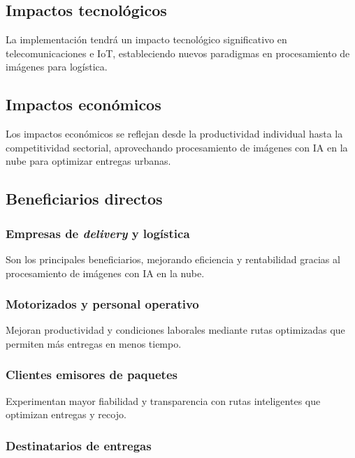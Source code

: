 \subsection{Impactos tecnológicos}

La implementación tendrá un impacto tecnológico significativo en telecomunicaciones e IoT, estableciendo nuevos paradigmas en procesamiento de imágenes para logística.

\subsection{Impactos económicos}

Los impactos económicos se reflejan desde la productividad individual hasta la competitividad sectorial, aprovechando procesamiento de imágenes con IA en la nube para optimizar entregas urbanas.

\subsection{Beneficiarios directos}

\subsubsection{Empresas de \textit{delivery} y logística}

Son los principales beneficiarios, mejorando eficiencia y rentabilidad gracias al procesamiento de imágenes con IA en la nube.

\subsubsection{Motorizados y personal operativo}

Mejoran productividad y condiciones laborales mediante rutas optimizadas que permiten más entregas en menos tiempo.

\subsubsection{Clientes emisores de paquetes}

Experimentan mayor fiabilidad y transparencia con rutas inteligentes que optimizan entregas y recojo.

\subsubsection{Destinatarios de entregas}


